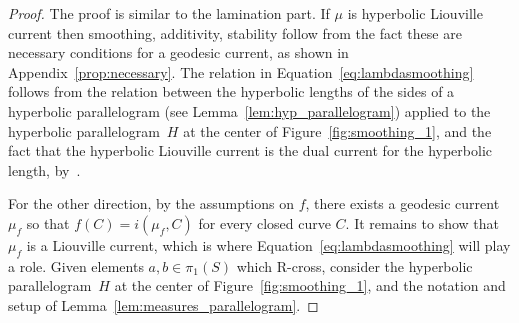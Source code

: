 \documentclass[11pt]{amsart}
\numberwithin{equation}{section}
\numberwithin{figure}{section}
\theoremstyle{definition}
\theoremstyle{plain}
\begin{document}
\begin{proof}
The proof is similar to the lamination part.
If $\mu$ is hyperbolic Liouville current then smoothing, additivity, stability follow from the fact these are necessary conditions for a geodesic current, as shown in Appendix~\ref{prop:necessary}. The relation in Equation~\eqref{eq:lambdasmoothing} follows from the relation between the hyperbolic lengths of the sides of a hyperbolic parallelogram (see Lemma~\ref{lem:hyp_parallelogram}) applied to the hyperbolic parallelogram~$H$ at the center of
Figure~\ref{fig:smoothing_1}, and the fact that the hyperbolic Liouville current is the dual current for the hyperbolic length, by~\cite[Proposition~14]{Bonahon88:GeodesicCurrent}.

For the other direction, by the assumptions on $f$, there exists a
geodesic current $\mu_f$ so that $f(C)=i(\mu_f,C)$ for every closed
curve $C$.
It remains to show that $\mu_f$ is a Liouville current, which is where Equation~\eqref{eq:lambdasmoothing} will play a role.
Given elements $a, b \in \pi_1(S)$ which R-cross, consider the hyperbolic parallelogram~$H$ at the center of
Figure~\ref{fig:smoothing_1}, and the notation and setup of Lemma~\ref{lem:measures_parallelogram}.


\end{proof}
\end{document}
